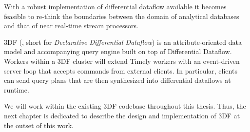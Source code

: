 \documentclass[../index.tex]{subfiles}
\begin{document}
With a robust implementation of differential dataflow available it
becomes feasible to re-think the boundaries between the domain of
analytical databases and that of near real-time stream processors.

3DF (\cite{declarative}, short for \emph{Declarative Differential
  Dataflow}) is an attribute-oriented data model and accompanying
query engine built on top of Differential Dataflow. Workers within a
3DF cluster will extend Timely workers with an event-driven server
loop that accepts commands from external clients. In particular,
clients can send query plans that are then synthesized into
differential dataflows at runtime.

We will work within the existing 3DF codebase throughout this
thesis. Thus, the next chapter is dedicated to describe the design and
implementation of 3DF at the outset of this work.
\end{document}
